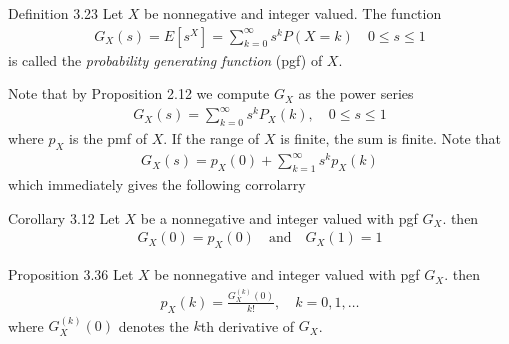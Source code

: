 


%
\begin{boks}{Definition 3.23}
  Let $X$ be nonnegative and integer valued. The function
  \begin{align*}
    G_X(s) = E[s^X] = \sum_{k=0}^\infty s^kP(X=k) \quad 0 \leq s \leq 1
  \end{align*}
  is called the \textit{probability generating function} (pgf) of $X$.
\end{boks}
Note that by Proposition 2.12 we compute $G_X$ as the power series
\begin{align*}
  G_X(s) = \sum_{k = 0}^\infty s^k P_X(k), \quad 0 \leq s \leq 1
\end{align*}
where $p_X$ is the pmf of $X$. If the range of $X$ is finite, the sum is finite. Note that
\begin{align*}
  G_X(s) = p_X(0) + \sum_{k = 1}^\infty s^k p_X(k)
\end{align*}
which immediately gives the following corrolarry
\begin{boks}{Corollary 3.12}
  Let $X$ be a nonnegative and integer valued with pgf $G_X$. then
  \begin{align*}
    G_X(0) = p_X(0) \quad \text{and} \quad G_X(1) = 1
  \end{align*}
\end{boks}
%
\begin{boks}{Proposition 3.36}
  Let $X$ be nonnegative and integer valued with pgf $G_X$. then
  \begin{align*}
    p_X(k) = \frac{G_X^{(k)}(0)}{k!}, \quad k = 0,1,\ldots
  \end{align*}
  where $G_X^{(k)}(0)$ denotes the $k$th derivative of $G_X$.
\end{boks}
